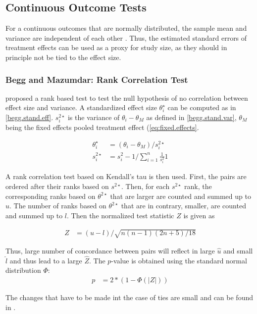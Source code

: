 \documentclass[11pt,a4paper,twoside]{book}\usepackage[]{graphicx}\usepackage[]{color}
\begin{document}
\subsection{Continuous Outcome Tests}
For a continuous outcomes that are normally distributed, the sample mean and variance are independent of each other \cite[120]{meta.w.R}. Thus, the estimated standard errors of treatment effects can be used as a proxy for study size, as they should in principle not be tied to the effect size.

\subsubsection{Begg and Mazumdar: Rank Correlation Test} \label{sec:Begg}
\citet{begg.ties} proposed a rank based test to test the null hypothesis of no correlation between effect size and variance.
A standardized effect size $\theta_i^\star$ can be computed as in \ref{begg.stand.eff}. $s_i^{2\star}$ is the variance of $\theta_i - \theta_M$ as defined in \ref{begg.stand.var}, $\theta_M$ being the fixed effects pooled treatment effect (\ref{eq:fixed.effects}. 

\begin{align}
\theta_i^\star &= (\theta_i - \theta_M)/s_i^{2\star} \label{begg.stand.eff}  \\
s_i^{2\star} &= s_i^2 - 1/\sum_{i = 1}^n\frac{1}{s_i^2}1 \label{begg.stand.var} 
\end{align}

A rank correlation test based on Kendall's tau is then used. First, the pairs are ordered after their ranks based on $s^{2\star}$. Then, for each $s^{2\star}$ rank, the corresponding ranks based on $\theta^{2\star}$ that are larger are counted and summed up to $u$. The number of ranks based on $\theta^{2\star}$ that are in contrary, smaller, are counted and summed up to $l$. Then the normalized test statistic $Z$ is given as

\begin{align}
Z &= (u - l)/\sqrt{n(n-1)(2n + 5)/18} \nonumber
\end{align}

Thus, large number of concordance between pairs will reflect in large $\hat{u}$ and small $\hat{l}$ and thus lead to a large $\hat{Z}$. The $p$-value is obtained using the standard normal distribution $\Phi$:
\begin{align}
p &= 2*(1-\Phi(|Z|)) \nonumber
\end{align}

The changes that have to be made int the case of ties are small and can be found in \cite[410]{begg.ties}.
\end{document}
